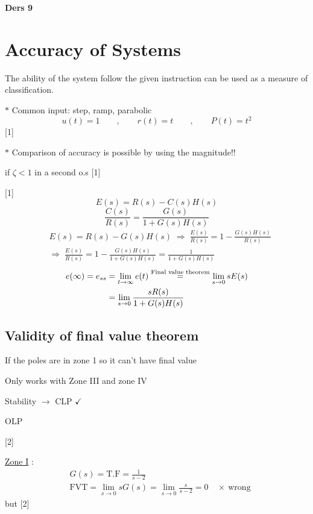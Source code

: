 \documentclass[11pt,a4paper]{article}
\begin{document}

\textbf{Ders 9}

\section{Accuracy of Systems}
The ability of the system follow the given instruction can be used as a measure of classification.

$\ast$ Common input: step, ramp, parabolic
\[ u(t)=1 \qquad,\qquad r(t)=t \qquad,\qquad P(t)=t^{2} \]
[1]

$\ast$ Comparison of accuracy is possible by using the  magnitude!!

if $\zeta<1$ in a second o.s
[1]

[1]
\[ E(s)=R(s)-C(s)H(s) \]
\[ \frac{C(s)}{R(s)}=\frac{G(s)}{1+G(s)H(s)} \]
\begin{align*}
&E(s)=R(s)-G(s)H(s)\;\Rightarrow\;\frac{E(s)}{R(s)}=1-\frac{G(s)H(s)}{R(s)}\\
&\Rightarrow\;\frac{E(s)}{R(s)}=1-\frac{G(s)H(s)}{1+G(s)H(s)}=\frac{1}{1+G(s)H(s)}
\end{align*}
\begin{align*}
e(\infty)=e_{ss}&=\lim_{t\to\infty}e(t)\overset{\text{\scriptsize Final value theorem}}{=}\lim_{s\to0}sE(s)\\
&=\lim_{s\to0}\frac{sR(s)}{1+G(s)H(s)}
\end{align*}

\subsection{Validity of final value theorem}
If the poles are in zone 1 so it can't have final value

Only works with Zone III and zone IV

Stability $\rightarrow$ CLP $\checkmark$

\hspace*{5.6em}OLP

[2]

\underline{Zone I} :
\begin{align*}
&G(s)=\text{T.F}=\frac{1}{s-2}\\
&\text{FVT}=\lim_{s\to0}sG(s)=\lim_{s\to0}\frac{s}{s-2}=0\quad\times\ \text{wrong}
\end{align*}
but
[2]
\end{document}
